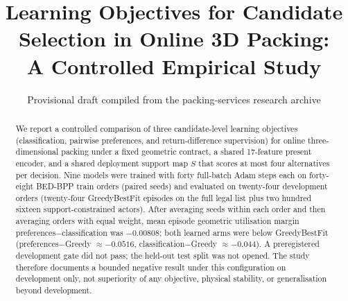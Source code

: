 \documentclass[11pt,a4paper]{article}
\title{Learning Objectives for Candidate Selection in Online 3D Packing:\\
A Controlled Empirical Study}
\author{Provisional draft compiled from the packing-services research archive}
\date{}
\begin{document}
\maketitle

\begin{abstract}
We report a controlled comparison of three candidate-level learning objectives
(classification, pairwise preferences, and return-difference supervision) for
online three-dimensional packing under a fixed geometric contract, a shared
17-feature present encoder, and a shared deployment support map $S$ that scores at most
four alternatives per decision. Nine models were trained with forty full-batch
Adam steps each on forty-eight BED-BPP train orders (paired seeds) and evaluated
on twenty-four development orders
(twenty-four GreedyBestFit episodes on the full legal list plus two hundred
sixteen support-constrained actors). After averaging seeds within each order and
then averaging orders with equal weight, mean episode geometric utilisation margin
preferences$-$classification was $-0.00808$; both learned arms were below
GreedyBestFit (preferences$-$Greedy $\approx -0.0516$,
classification$-$Greedy $\approx -0.044$). A preregistered development gate did
not pass; the held-out test split was not opened. The study therefore documents
a bounded negative result under this configuration on development only, not
superiority of any objective, physical stability, or generalisation beyond
development.
\end{abstract}










\appendix




\end{document}
